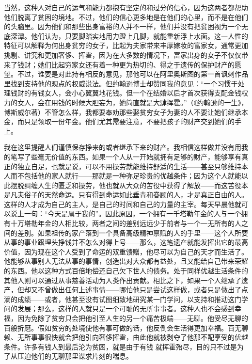 \documentclass[12pt,oneside]{book}
\begin{document}
当然，这种人对自己的运气和能力都抱有坚定的和过分的信心，因为这两者都帮助他们脱离了贫困的境地。不过，他们的信心更多地是在他们的心里，而不是在他们的头脑里。因为他们和那些出身富裕的人并不一样，他们并没有把贫困视为一个无底深潭。他们认为，只要脚踏实地用力蹬上几脚，就能重新浮上水面。这一人性的特征可以解释为何出身贫穷的女子，比起为夫家带来丰厚嫁妆的富家女，通常更加挑剔、讲究和更加奢侈、挥霍，因为在大多数的情况下，富家出身的女子不仅仅带来了钱财；她们比起穷家女还有着一种更为热切的、得之于遗传的保护财产的愿望。不过，谁要是对此持有相反的意见，那他可以在阿里奥斯图的第一首讽刺作品里找到支持他的观点的权威说法。但约翰逊博士却赞同我的意见：“一个习惯于处理钱财的有钱女人，会小心翼翼地花钱。但一个在结婚以后才首次获得支配金钱权力的女人，会在用钱的时候大胆妄为，她简直就是大肆挥霍。”（《约翰逊的一生》，博斯威尔著）不管怎么样，我都要奉劝那些娶贫穷女子为妻的人不要让她们继承本金，而只是领取一份年金。他们尤其需要注意，不要把孩子的财产交到她们的手上。 

我在这里提醒人们谨慎保存挣来的或者继承下来的财产。我相信这样做并没有用我的笔写了些毫无价值的东西。如果一个人从一开始就拥有足够的财产，能够享有真正的独立自足，也就是说，可以不用操劳就能维持舒适的生活——甚至只够维持本人而不包括他的家人就行——那就是一种弥足珍贵的优越条件；因为这个人就能以此摆脱纠缠人生的匮乏和操劳，他也就从大众的苦役中获得了解放——而这苦役本是凡夫俗子的天然命运。只有得到命运如此垂青和眷顾的人，才是真正自由的人。这样的人才成为自己的主人，是自己的时间和自己的力量的主宰。每天早晨他就可以说上一句：“今天是属于我的”。因此原因，一个拥有一千塔勒年金的人与一个拥有十万塔勒年金的人相比较，两者之间的差别远远少于前者与一个一无所有的人之间的差别。如果祖传的家产落到一个具备高级精神禀赋的人的手里——这个人所要从事的事业跟埋头挣钱并不怎么对得上号——那么，这笔遗产就能发挥出它的最高价值，因为现在这个人受到了命运的双重馈赠，他尽可以为自己的天才而生活了。他能够从事别人无法从事的事情，创造出对大众都有益处，且又能给自己带来荣耀的东西。他以这种方式百倍地偿还自己欠下世人的债务。处于同样优越生活条件的其他人则可以通过从事慈善活动为人类作出贡献。相比之下，如果一个人继承了遗产，但却又不曾做出任何上述事情——哪怕他只是尝试这样做，或者只是做出了点滴的成绩——或者，他甚至没有试图细致地研究某一门学问，以支持和推动这门学问的发展；那么，这样的人就只是一个可耻的无所事事者。这种人也不会感到幸福，因为免除了贫穷只会把他引至人生的另一个痛苦极端——无聊。他受尽无聊的百般折磨。假如贫穷的处境使他有事可做的话，他反倒会生活得更加幸福。百无聊赖、无所事事很快就会把他引向奢侈挥霍，由此他就被剥夺了他那不配享受的优越条件。许多有钱人到最后沦为贫困，就是由于有钱
就挥霍殆尽，目的只不过是为了从压迫他们的无聊那里谋求片刻的喘息。 
\end{document}
